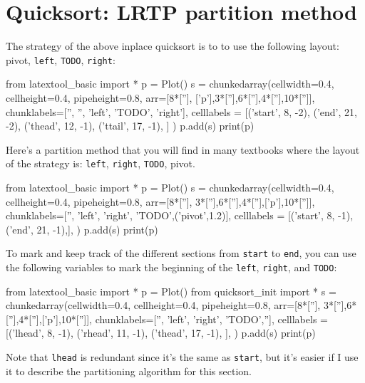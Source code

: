 \section{Quicksort: LRTP partition method}

The strategy of the above inplace quicksort is to to use the following
layout: pivot, \verb!left!, \verb!TODO!, \verb!right!:
\begin{python}
from latextool_basic import *
p = Plot()
s = chunkedarray(cellwidth=0.4, 
                   cellheight=0.4,
                   pipeheight=0.8,
                   arr=[8*[''], ['p'],3*[''],6*[''],4*[''],10*['']],
                   chunklabels=['', '', 'left', 'TODO', 'right'],
                   celllabels = [('start', 8, -2),
                                 ('end',   21, -2),
                                 ('thead', 12, -1),
                                 ('ttail', 17, -1),
                                ]
)
p.add(s)
print(p)
\end{python}

Here's a partition method that you will find in many textbooks
where the layout of the strategy is:
\verb!left!, \verb!right!, \verb!TODO!, pivot.
\begin{python}
from latextool_basic import *
p = Plot()
s = chunkedarray(cellwidth=0.4, 
                   cellheight=0.4,
                   pipeheight=0.8,
                   arr=[8*[''], 3*[''],6*[''],4*[''],['p'],10*['']],
                   chunklabels=['', 'left', 'right', 'TODO',('pivot',1.2)],
                   celllabels = [('start', 8, -1),
                                 ('end',   21, -1),],
)
p.add(s)
print(p)
\end{python}
To mark and keep track of the different sections from \verb!start! to
\verb!end!, you can use the following variables to mark the beginning
of the \verb!left!, \verb!right!, and \verb!TODO!:
\begin{python}
from latextool_basic import *
p = Plot()
from quicksort_init import *
s = chunkedarray(cellwidth=0.4, 
                   cellheight=0.4,
                   pipeheight=0.8,
                   arr=[8*[''], 3*[''],6*[''],4*[''],['p'],10*['']],
                   chunklabels=['', 'left', 'right', 'TODO',''],
                   celllabels = [('lhead', 8, -1),
                                 ('rhead', 11, -1),
                                 ('thead', 17, -1),
                                ],
)
p.add(s)
print(p)
\end{python}
Note that \verb!lhead! is redundant since it's the same as
\verb!start!, but it's easier if I use it to describe the partitioning
algorithm for this section.


